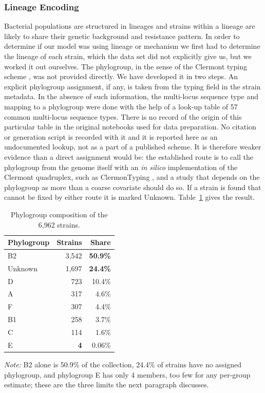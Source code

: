 \documentclass[journal]{IEEEtran}
\begin{document}
\subsubsection{Lineage Encoding}
Bacterial populations are structured in lineages and strains within a lineage are
likely to share their genetic background and resistance pattern. In order to
determine if our model was using lineage or mechanism we first had to determine the
lineage of each strain, which the data set did not explicitly give us, but we worked
it out ourselves. The phylogroup, in the sense of the Clermont typing scheme
\cite{clermont2013phylotyping}, was not provided directly. We have developed it in
two steps. An explicit phylogroup assignment, if any, is taken from the typing field
in the strain metadata. In the absence of such information, the multi-locus
sequence type and mapping to a phylogroup were done with the help of a look-up table
of 57 common multi-locus sequence types. There is no record of the origin of this
particular table in the original notebooks used for data preparation. No citation or
generation script is recorded with it and it is reported here as an undocumented
lookup, not as a part of a published scheme. It is therefore weaker evidence than a
direct assignment would be: the established route is to call the phylogroup from the
genome itself with an \textit{in silico} implementation of the Clermont quadruplex,
such as ClermonTyping \cite{beghain2018clermontyping}, and a study that depends on
the phylogroup as more than a coarse covariate should do so. If a strain is found
that cannot be fixed by either route it is marked Unknown.
Table~\ref{tab:phylogroups} gives the result.

\begin{table}[!tb]
\caption{Phylogroup composition of the 6,962 strains.}
\label{tab:phylogroups}
\centering
\small
\setlength{\tabcolsep}{4pt}
\renewcommand{\arraystretch}{1.05}
\begin{tabular}{|l|r|r|}
\hline
\rowcolor{headgrey}
\textbf{Phylogroup} & \textbf{Strains} & \textbf{Share} \\ \hline
B2      & 3,542 & \textbf{50.9\%} \\ \hline
Unknown & 1,697 & \textbf{24.4\%} \\ \hline
D       &   723 & 10.4\% \\ \hline
A       &   317 &  4.6\% \\ \hline
F       &   307 &  4.4\% \\ \hline
B1      &   258 &  3.7\% \\ \hline
C       &   114 &  1.6\% \\ \hline
E       & \textbf{4} &  0.06\% \\ \hline
\end{tabular}
\renewcommand{\arraystretch}{1.0}
\vspace{0.4em}

\noindent\footnotesize\textit{Note:} B2 alone is 50.9\% of the collection, 24.4\% of strains
have no assigned phylogroup, and phylogroup E has only 4 members, too few for any per-group
estimate; these are the three limits the next paragraph discusses.
\end{table}
\end{document}
